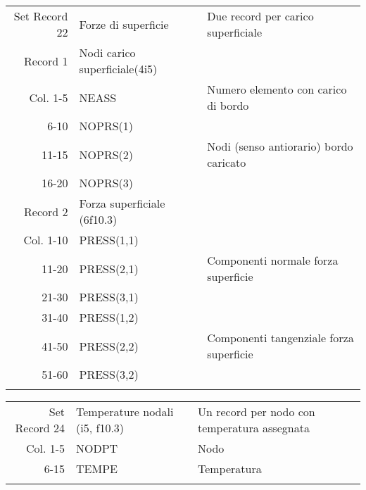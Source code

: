 \begin{tabular}{rll}
	Set Record 22& Forze di superficie            & Due record per carico superficiale                \\
	Record 1     & Nodi carico superficiale(4i5)  &                                                   \\
	Col.  1-5    & NEASS                          & Numero elemento con carico di bordo               \\
	6-10    & NOPRS(1)                       &                                                   \\
	11-15    & NOPRS(2)                       & Nodi (senso antiorario)  bordo caricato           \\
	16-20    & NOPRS(3)                       &                                                   \\
	Record 2     & Forza superficiale (6f10.3)    &                                                   \\
	Col. 1-10    & PRESS(1,1)                     &                                                   \\
	11-20    & PRESS(2,1)                     & Componenti normale forza superficie               \\
	21-30    & PRESS(3,1)                     &                                                   \\
	31-40    & PRESS(1,2)                     &                                                   \\
	41-50    & PRESS(2,2)                     & Componenti tangenziale forza superficie           \\
	51-60    & PRESS(3,2)                     &                                                   \\
	&                                &                                                   \\
\end{tabular}

\begin{tabular}{rll}
	Set Record 24& Temperature nodali (i5, f10.3) & Un record per nodo con temperatura assegnata      \\
	Col.  1-5    & NODPT                          & Nodo                                              \\
	6-15    & TEMPE                          & Temperatura                                       \\
	&                                &                                                   \\
\end{tabular}


